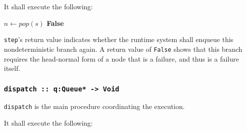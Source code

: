 \noindent
It shall execute the following:

\begin{algorithm}[H]
$n \gets pop(s)$\;
\Return \textbf{False}\;
\end{algorithm}

\texttt{step}'s return value indicates whether the runtime system shall enqueue this nondeterministic branch again.
A return value of \texttt{False} shows that this branch requires the head-normal form of a node that is a failure, and thus is a failure itself.

\iffalse
It shall pop a node from the stack.
\begin{itemize}
	\item If this node is a constructor or literal, return whether the stack is non-empty.
	\item If this node is a failure, return \texttt{False}.
	\item If this node is a function call, call the referenced function and pass this node.
	If the return code of this function shows, that no argument must be evaluated first, return \texttt{True}
	If the return code indicates, that an argument must be evaluated first, this argument shall be examined.
	If it is a choice, \texttt{pull} (see \ref{pull}) shall execute a pull-tab step with our original node and the position of the required argument.
	Then return True.
\end{itemize}
\fi

\subsubsection{\texttt{dispatch ::~q:Queue* -> Void}}
\label{dispatch}

\texttt{dispatch} is the main procedure coordinating the execution.

\noindent
It shall execute the following:

